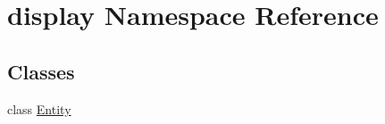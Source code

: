 \hypertarget{namespacedisplay}{\section{display Namespace Reference}
\label{namespacedisplay}
}
\subsection*{Classes}
\begin{DoxyCompactItemize}
\item 
class \hyperlink{classdisplay_1_1Entity}{Entity}
\end{DoxyCompactItemize}
